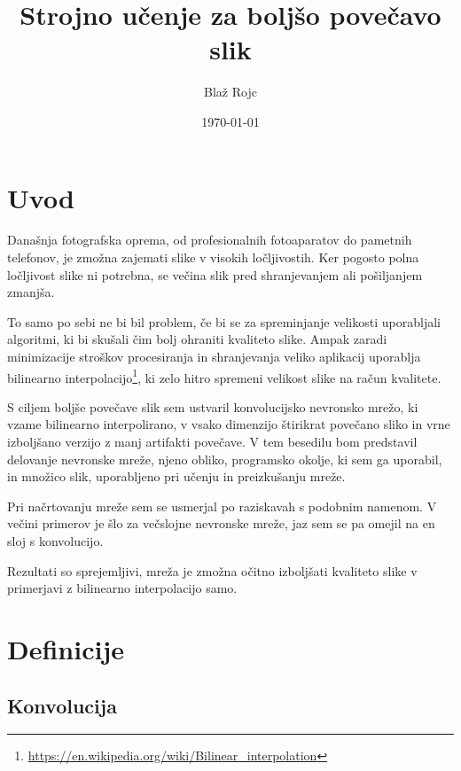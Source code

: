 \documentclass[a4paper,11pt]{article}
\title{\textbf{Strojno učenje za boljšo povečavo slik}}
\author{Blaž Rojc}
\date{\today}
\begin{document}
\maketitle

\section{Uvod}

Današnja fotografska oprema, od profesionalnih fotoaparatov do pametnih telefonov, je zmožna zajemati slike v visokih ločljivostih.
Ker pogosto polna ločljivost slike ni potrebna, se večina slik pred shranjevanjem ali pošiljanjem zmanjša.

To samo po sebi ne bi bil problem, če bi se za spreminjanje velikosti uporabljali algoritmi, ki bi skušali čim bolj ohraniti kvaliteto slike.
Ampak zaradi minimizacije stroškov procesiranja in shranjevanja veliko aplikacij uporablja bilinearno interpolacijo\footnote{\url{
	https://en.wikipedia.org/wiki/Bilinear\_interpolation}}, ki zelo hitro spremeni velikost slike na račun kvalitete.

S ciljem boljše povečave slik sem ustvaril konvolucijsko nevronsko mrežo, ki vzame bilinearno interpolirano, v vsako dimenzijo štirikrat povečano sliko
	in vrne izboljšano verzijo z manj artifakti povečave.
V tem besedilu bom predstavil delovanje nevronske mreže, njeno obliko, programsko okolje, ki sem ga uporabil, in množico slik, uporabljeno
	pri učenju in preizkušanju mreže.

Pri načrtovanju mreže sem se usmerjal po raziskavah s podobnim namenom.\cite{intel1, intel2, intel3}
V večini primerov je šlo za večslojne nevronske mreže, jaz sem se pa omejil na en sloj s konvolucijo.

Rezultati so sprejemljivi, mreža je zmožna očitno izboljšati kvaliteto slike v primerjavi z bilinearno interpolacijo samo.

\section{Definicije}


\subsection{Konvolucija}
\end{document}

